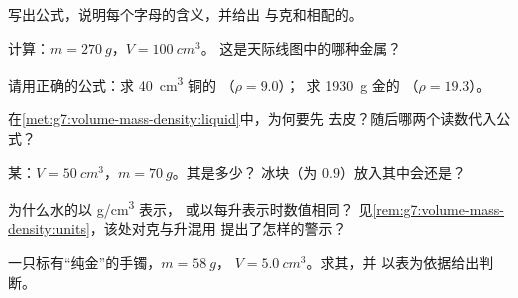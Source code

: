 \begin{exercise}[$\star$]\label{exo:g7:volume-mass-density:1}
写出公式，说明每个字母的含义，并给出
与克和相配的。
\end{exercise}

\begin{exercise}[$\star$]\label{exo:g7:volume-mass-density:2}
计算：$m = \qty{270}{g}$，$V = \qty{100}{cm^3}$。
这是天际线图中的哪种金属？
\end{exercise}

\begin{exercise}[$\star$]\label{exo:g7:volume-mass-density:3}
请用正确的公式：求 \qty{40}{cm^3} 铜的
（$\rho = 9.0$）；\ 求 \qty{1930}{g} 金的
（$\rho = 19.3$）。
\end{exercise}

\begin{exercise}[$\star$]\label{exo:g7:volume-mass-density:4}
在\cref{met:g7:volume-mass-density:liquid}中，为何要先
去皮？随后哪两个读数代入公式？
\end{exercise}

\begin{exercise}[$\star$]\label{exo:g7:volume-mass-density:5}
某：$V = \qty{50}{cm^3}$，$m = \qty{70}{g}$。其是多少？
冰块（为 $0.9$）放入其中会还是？
\end{exercise}

\begin{exercise}[$\star$]\label{exo:g7:volume-mass-density:6}
为什么水的以 \unit{g/cm^3} 表示，
或以每升表示时数值相同？
见\cref{rem:g7:volume-mass-density:units}，该处对克与升混用
提出了怎样的警示？
\end{exercise}

\begin{exercise}[$\star$]\label{exo:g7:volume-mass-density:7}
一只标有“纯金”的手镯，$m = \qty{58}{g}$，
$V = \qty{5.0}{cm^3}$。求其，并
以表为依据给出判断。
\end{exercise}

